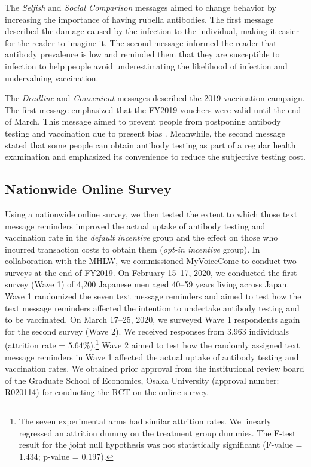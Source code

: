 \documentclass[
      12pt,
    a4paper
]{article}
\begin{document}
The \emph{Selfish} and \emph{Social Comparison} messages aimed to change behavior by increasing the importance of having rubella antibodies. The first message described the damage caused by the infection to the individual, making it easier for the reader to imagine it. The second message informed the reader that antibody prevalence is low and reminded them that they are susceptible to infection to help people avoid underestimating the likelihood of infection and undervaluing vaccination.

The \emph{Deadline} and \emph{Convenient} messages described the 2019 vaccination campaign. The first message emphasized that the FY2019 vouchers were valid until the end of March. This message aimed to prevent people from postponing antibody testing and vaccination due to present bias \citep{ODonoghue2001}. Meanwhile, the second message stated that some people can obtain antibody testing as part of a regular health examination and emphasized its convenience to reduce the subjective testing cost.

\hypertarget{survey}{%
\subsection{Nationwide Online Survey}\label{survey}}

Using a nationwide online survey, we then tested the extent to which those text message reminders improved the actual uptake of antibody testing and vaccination rate in the \emph{default incentive} group and the effect on those who incurred transaction costs to obtain them (\emph{opt-in incentive} group). In collaboration with the MHLW, we commissioned MyVoiceCome to conduct two surveys at the end of FY2019. On February 15--17, 2020, we conducted the first survey (Wave 1) of 4,200 Japanese men aged 40--59 years living across Japan. Wave 1 randomized the seven text message reminders and aimed to test how the text message reminders affected the intention to undertake antibody testing and to be vaccinated. On March 17--25, 2020, we surveyed Wave 1 respondents again for the second survey (Wave 2). We received responses from 3,963 individuals (attrition rate = \(5.64\)\%).\footnote{The seven experimental arms had similar attrition rates. We linearly regressed an attrition dummy on the treatment group dummies. The F-test result for the joint null hypothesis was not statistically significant (F-value = \(1.434\); p-value = \(0.197\)).} Wave 2 aimed to test how the randomly assigned text message reminders in Wave 1 affected the actual uptake of antibody testing and vaccination rates. We obtained prior approval from the institutional review board of the Graduate School of Economics, Osaka University (approval number: R020114) for conducting the RCT on the online survey.
\end{document}

